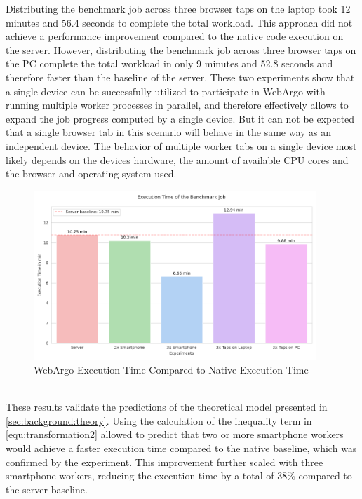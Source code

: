 Distributing the benchmark job across three browser taps on the laptop took 12 minutes and 56.4 seconds to complete the total workload. This approach did not achieve a performance improvement compared to the native code execution on the server. However, distributing the benchmark job across three browser taps on the \acs{PC} complete the total workload in only 9 minutes and 52.8 seconds and therefore faster than the baseline of the server. These two experiments show that a single device can be successfully utilized to participate in WebArgo with running multiple worker processes in parallel, and therefore effectively allows to expand the job progress computed by a single device. But it can not be expected that a single browser tab in this scenario will behave in the same way as an independent device. The behavior of multiple worker tabs on a single device most likely depends on the devices hardware, the amount of available \acs{CPU} cores and the browser and operating system used.
\begin{figure}[htbp]
    \centering
    \includegraphics[width=0.95\textwidth]{gfx/figures/Evaluation_A.png}
    \caption{WebArgo Execution Time Compared to Native Execution Time}
    \label{fig:evaluation:experiment-A}
\end{figure}
~\\
These results validate the predictions of the theoretical model presented in \autoref{sec:background:theory}. Using the calculation of the inequality term in \eqref{equ:transformation2} allowed to predict that two or more smartphone workers would achieve a faster execution time compared to the native baseline, which was confirmed by the experiment. This improvement further scaled with three smartphone workers, reducing the execution time by a total of 38\% compared to the server baseline.

